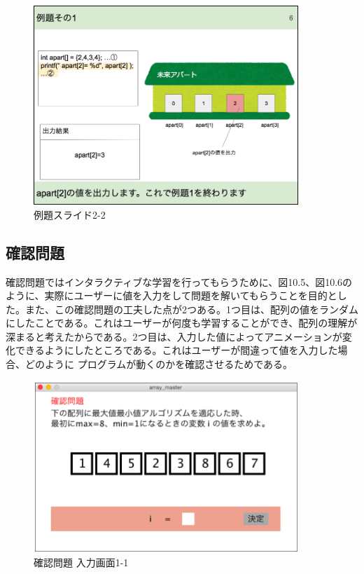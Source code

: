 \documentclass[openany,11pt,papersize]{jsbook}
\begin{document}
\begin{figure}[H]
\begin{center}
\includegraphics[width=10cm, bb=0 0 850 639]{img/9thParagraph/reidai_03.png}
\end{center}
\caption{例題スライド2-2}
\end{figure}


\subsection{確認問題}
確認問題ではインタラクティブな学習を行ってもらうために、図10.5、図10.6のように、実際にユーザーに値を入力をして問題を解いてもらうことを目的とした。また、この確認問題の工夫した点が2つある。1つ目は、配列の値をランダムにしたことである。これはユーザーが何度も学習することができ、配列の理解が深まると考えたからである。2つ目は、入力した値によってアニメーションが変化できるようにしたところである。これはユーザーが間違って値を入力した場合、どのように
プログラムが動くのかを確認させるためである。


\begin{figure}[H]
\begin{center}
\includegraphics[width=10cm, bb=0 0 798 516]{img/9thParagraph/kakuninmondai_01.png}
\end{center}
\caption{確認問題 入力画面1-1}
\end{figure}
\end{document}
